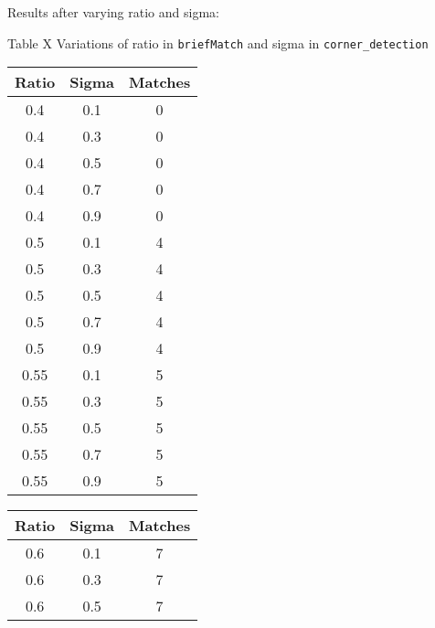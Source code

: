 \documentclass[12pt,letterpaper, onecolumn]{exam}
\begin{document}
\begin{questions}
    \begin{solution}
        Results after varying ratio and sigma:
        \begin{center}
            Table X Variations of ratio in \texttt{briefMatch} and sigma in \texttt{corner\_detection}
        \end{center}
        \begin{center}
            \begin{tabular}{|c|c|c|}
                \hline
                \textbf{Ratio} & \textbf{Sigma} & \textbf{Matches} \\
                \hline
                0.4 & 0.1 & 0 \\
                \hline
                0.4 & 0.3 & 0 \\
                \hline
                0.4 & 0.5 & 0 \\
                \hline
                0.4 & 0.7 & 0 \\
                \hline
                0.4 & 0.9 & 0 \\
                \hline
                0.5 & 0.1 & 4 \\
                \hline
                0.5 & 0.3 & 4 \\
                \hline
                0.5 & 0.5 & 4 \\
                \hline
                0.5 & 0.7 & 4 \\
                \hline
                0.5 & 0.9 & 4 \\
                \hline
                0.55 & 0.1 & 5 \\
                \hline
                0.55 & 0.3 & 5 \\
                \hline
                0.55 & 0.5 & 5 \\
                \hline
                0.55 & 0.7 & 5 \\
                \hline
                0.55 & 0.9 & 5 \\
                \hline
            \end{tabular}
            \quad
            \begin{tabular}{|c|c|c|}
                \hline
                \textbf{Ratio} & \textbf{Sigma} & \textbf{Matches} \\
                \hline
                0.6 & 0.1 & 7 \\
                \hline
                0.6 & 0.3 & 7 \\
                \hline
                0.6 & 0.5 & 7 \\

\end{tabular}
\end{center}
\end{solution}
\end{questions}
\end{document}
